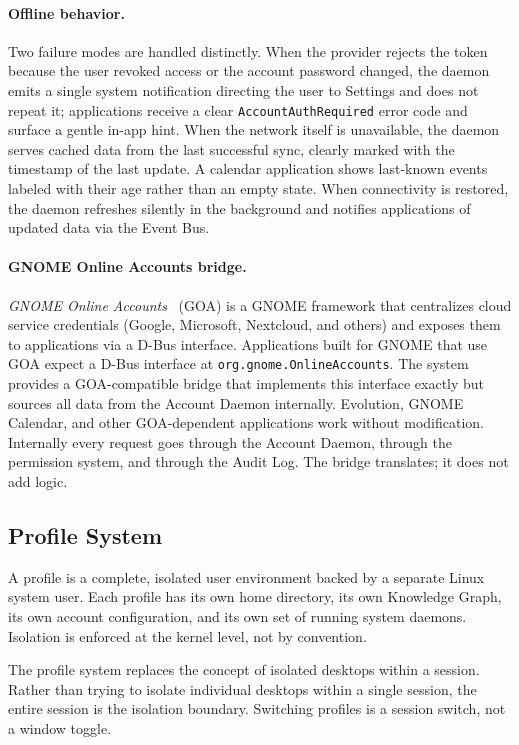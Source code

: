 \paragraph{Offline behavior.}
Two failure modes are handled distinctly. When the provider rejects the token
because the user revoked access or the account password changed, the daemon
emits a single system notification directing the user to Settings and does not
repeat it; applications receive a clear \texttt{AccountAuthRequired} error
code and surface a gentle in-app hint. When the network itself is unavailable,
the daemon serves cached data from the last successful sync, clearly marked
with the timestamp of the last update. A calendar application shows last-known
events labeled with their age rather than an empty state. When connectivity
is restored, the daemon refreshes silently in the background and notifies
applications of updated data via the Event Bus.

\paragraph{GNOME Online Accounts bridge.}
\emph{GNOME Online Accounts}~\cite{gnome:goa} (GOA) is a GNOME framework
that centralizes cloud service credentials (Google, Microsoft, Nextcloud, and
others) and exposes them to applications via a D-Bus interface.
Applications built for GNOME that use GOA expect a D-Bus
interface at \texttt{org.gnome.OnlineAccounts}. The system provides a
GOA-compatible bridge that implements this interface exactly but sources all
data from the Account Daemon internally. Evolution, GNOME Calendar, and other
GOA-dependent applications work without modification. Internally every request
goes through the Account Daemon, through the permission system, and through
the Audit Log. The bridge translates; it does not add logic.

\subsection{Profile System}
\label{sec:profiles}

A profile is a complete, isolated user environment backed by a separate Linux
system user. Each profile has its own home directory, its own Knowledge Graph,
its own account configuration, and its own set of running system daemons.
Isolation is enforced at the kernel level, not by convention.

The profile system replaces the concept of isolated desktops within a session.
Rather than trying to isolate individual desktops within a single session, the
entire session is the isolation boundary. Switching profiles is a session
switch, not a window toggle.

